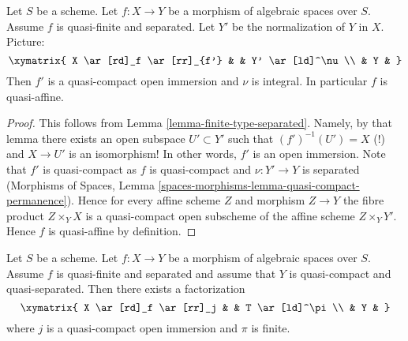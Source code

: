 \begin{lemma}
\label{lemma-quasi-finite-separated-quasi-affine}
Let $S$ be a scheme.
Let $f : X \to Y$ be a morphism of algebraic spaces over $S$.
Assume $f$ is quasi-finite and separated.
Let $Y'$ be the normalization of $Y$ in $X$.
Picture:
$$
\xymatrix{
X \ar[rd]_f \ar[rr]_{f'} & & Y' \ar[ld]^\nu \\
& Y &
}
$$
Then $f'$ is a quasi-compact open immersion and $\nu$ is integral.
In particular $f$ is quasi-affine.
\end{lemma}

\begin{proof}
This follows from Lemma \ref{lemma-finite-type-separated}. Namely, by
that lemma there exists an open subspace $U' \subset Y'$ such that
$(f')^{-1}(U') = X$ (!) and $X \to U'$ is an isomorphism! In other
words, $f'$ is an open immersion. Note that $f'$ is quasi-compact as
$f$ is quasi-compact and $\nu : Y' \to Y$ is separated
(Morphisms of Spaces, Lemma
\ref{spaces-morphisms-lemma-quasi-compact-permanence}).
Hence for every affine scheme $Z$ and morphism $Z \to Y$ the
fibre product $Z \times_Y X$ is a quasi-compact open subscheme
of the affine scheme $Z \times_Y Y'$. Hence $f$ is quasi-affine by
definition.
\end{proof}

\begin{lemma}
\label{lemma-quasi-finite-separated-pass-through-finite}
Let $S$ be a scheme.
Let $f : X \to Y$ be a morphism of algebraic spaces over $S$.
Assume $f$ is quasi-finite and separated and assume that
$Y$ is quasi-compact and quasi-separated. Then there exists
a factorization
$$
\xymatrix{
X \ar[rd]_f \ar[rr]_j & & T \ar[ld]^\pi \\
& Y &
}
$$
where $j$ is a quasi-compact open immersion and $\pi$ is finite.
\end{lemma}

